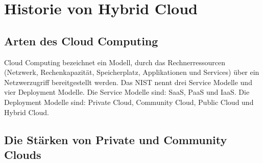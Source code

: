 \newpage
\section{Historie von Hybrid Cloud} \label{infrastruktur}

\subsection{Arten des Cloud Computing}

Cloud Computing bezeichnet ein Modell, durch das Rechnerressourcen (Netzwerk,
Rechenkapazität, Speicherplatz, Applikationen und Services) über ein
Netzwerzugriff bereitgestellt werden. Das \ac{NIST} nennt drei Service Modelle
und vier Deployment Modelle. Die Service Modelle sind: \ac{SaaS}, \ac{PaaS} und
\ac{IaaS}. Die Deployment Modelle sind: Private Cloud, Community Cloud, Public
Cloud und Hybrid Cloud.

\subsection{Die Stärken von Private und Community Clouds}


